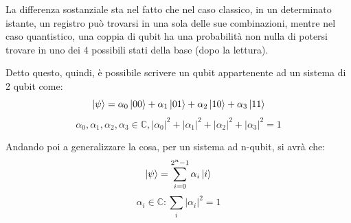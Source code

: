 La differenza sostanziale sta nel fatto che nel caso classico, in un determinato istante, un registro può trovarsi in una sola delle sue combinazioni, mentre nel caso quantistico, una coppia di qubit ha una probabilità non nulla di potersi trovare in uno dei 4 possibili stati della base (dopo la lettura).


Detto questo, quindi, è possibile scrivere un qubit appartenente ad un sistema di 2 qubit come:
\[
\ket{\psi} = \alpha_0 \ket{00} + \alpha_1 \ket{01} + \alpha_2 \ket{10} + \alpha_3 \ket{11}
\]
\[
\alpha_0, \alpha_1, \alpha_2, \alpha_3 \in \mathbb{C}, |\alpha_0|^2 + |\alpha_1|^2 + |\alpha_2|^2 + |\alpha_3|^2 = 1
\]

Andando poi a generalizzare la cosa, per un sistema ad n-qubit, si avrà che:
\[
\ket{\psi} = \sum_{i=0}^{2^n-1} \alpha_i \ket{i}
\]
\[
\alpha_i \in \mathbb{C} : \sum_{i}|\alpha_i|^2=1
\]